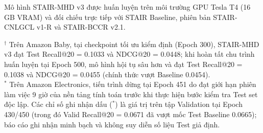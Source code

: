 Mô hình STAIR-MHD v3 được huấn luyện trên môi trường GPU Tesla T4 (16 GB VRAM) và đối chiếu trực tiếp với STAIR Baseline, phiên bản STAIR-CNLGCL v1-R và STAIR-BCCR v2.1.

\begin{table}[H]
\centering
\small
\setlength{\tabcolsep}{5pt}
\renewcommand{\arraystretch}{1.2}
\caption{Kết quả thực nghiệm của STAIR-MHD v3 đối chiếu với Baseline, v1-R và v2.1 trên ba tập dữ liệu.}
\label{tab:stair_mhd_results}
\vspace{2pt}
\begin{flushleft}
\footnotesize
$^\dagger$ Trên Amazon Baby, tại checkpoint tối ưu kiểm định (Epoch 300), STAIR-MHD v3 đạt Test Recall@20 = 0.1033 và NDCG@20 = 0.0448; khi hoàn tất chu trình huấn luyện tại Epoch 500, mô hình hội tụ sâu hơn và đạt Test Recall@20 = 0.1038 và NDCG@20 = 0.0455 (chính thức vượt Baseline 0.0454).\\
$^*$ Trên Amazon Electronics, tiến trình dừng tại Epoch 451 do đạt giới hạn phiên làm việc 9 giờ của nền tảng tính toán trước khi thực hiện bước kiểm tra Test set độc lập. Các chỉ số ghi nhận dấu ($^*$) là giá trị trên tập Validation tại Epoch 430/450 (trong đó Valid Recall@20 = 0.0671 đã vượt mốc Test Baseline 0.0665); báo cáo ghi nhận minh bạch và không suy diễn số liệu Test giả định.
\end{flushleft}
\end{table}

